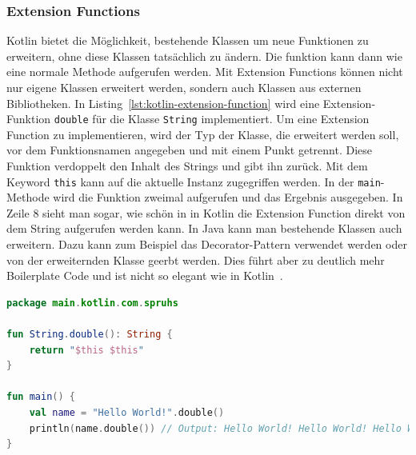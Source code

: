 \documentclass[11pt]{article}
\begin{document}
    \subsubsection{Extension Functions}
    Kotlin bietet die Möglichkeit, bestehende Klassen um neue Funktionen zu erweitern, ohne diese Klassen tatsächlich zu ändern.
    Die funktion kann dann wie eine normale Methode aufgerufen werden.
    Mit Extension Functions können nicht nur eigene Klassen erweitert werden, sondern auch Klassen aus externen Bibliotheken.
    In Listing~\ref{lst:kotlin-extension-function} wird eine Extension-Funktion \texttt{double} für die Klasse \texttt{String} implementiert.
    Um eine Extension Function zu implementieren, wird der Typ der Klasse, die erweitert werden soll, vor dem Funktionsnamen angegeben und mit einem Punkt getrennt.
    Diese Funktion verdoppelt den Inhalt des Strings und gibt ihn zurück.
    Mit dem Keyword \texttt{this} kann auf die aktuelle Instanz zugegriffen werden.
    In der \texttt{main}-Methode wird die Funktion zweimal aufgerufen und das Ergebnis ausgegeben.
    In Zeile 8 sieht man sogar, wie schön in in Kotlin die Extension Function direkt von dem String aufgerufen werden kann.
    In Java kann man bestehende Klassen auch erweitern.
    Dazu kann zum Beispiel das Decorator-Pattern verwendet werden oder von der erweiternden Klasse geerbt werden.
    Dies führt aber zu deutlich mehr Boilerplate Code und ist nicht so elegant wie in Kotlin~\cite{kotlin-extensions}.


    \begin{lstlisting}[language=Kotlin, caption={ExtensionFunction.kt}, label={lst:kotlin-extension-function}]
package main.kotlin.com.spruhs

fun String.double(): String {
    return "$this $this"
}

fun main() {
    val name = "Hello World!".double()
    println(name.double()) // Output: Hello World! Hello World! Hello World! Hello World!
}
    \end{lstlisting}
\end{document}
